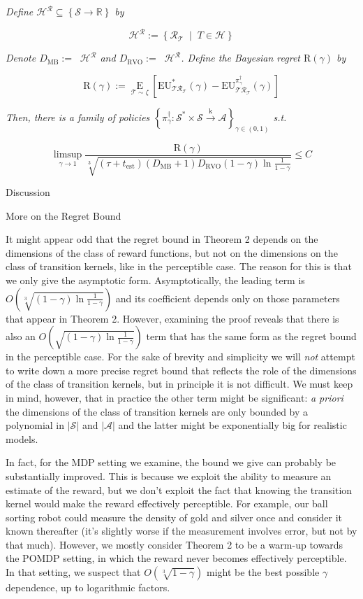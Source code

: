 \documentclass[a4paper]{article}
\newcommand{\Co}[1]{}
\newcommand{\AP}[1]{\left(#1\right)}
\newcommand{\AB}[1]{\left[#1\right]}
\newcommand{\AC}[1]{\left\{#1\right\}}
\newcommand{\ACM}[2]{\left\{#1\;\middle\vert\;#2\right\}}
\newcommand{\Ea}[2]{\underset{#1}{\operatorname{E}}\AB{#2}}
\newcommand{\Reals}{\mathbb{R}}
\newcommand{\Abs}[1]{\left\vert #1 \right\vert}
\newcommand{\K}{\xrightarrow{\mathrm{k}}}
\newcommand{\St}{\mathcal{S}}
\newcommand{\A}{\mathcal{A}}
\newcommand{\R}{\mathcal{R}}
\newcommand{\T}{\mathcal{T}}
\newcommand{\Hy}{\mathcal{H}}
\DeclareMathOperator{\RVO}{\dim_{RVO}}
\DeclareMathOperator{\MB}{\dim_{MB}}
\newcommand{\DRVO}{D_{\mathrm{RVO}}}
\newcommand{\DMB}{D_{\mathrm{MB}}}
\newcommand{\EU}{\mathrm{EU}}
\newcommand{\Reg}{\mathrm{R}}
\begin{document}
\textit{Define $\Hy^\R\subseteq\AC{\St\rightarrow\Reals}$ by}\Co{i}

$$\Hy^\R:=\ACM{\R_\T}{T\in\Hy}$$

\textit{Denote $\DMB:=\MB{\Hy^\R}$ and $\DRVO:=\RVO{\Hy^\R}$. Define the Bayesian regret $\Reg(\gamma)$ by}

$$\Reg(\gamma):=\Ea{\T\sim\zeta}{\EU^*_{\T\R_\T}(\gamma)-\EU^{\pi^\dagger_\gamma}_{\T\R_\T}(\gamma)}$$

\textit{Then, there is a family of policies $\AC{\pi^\dagger_\gamma:\St^*\times\St\K\A}_{\gamma\in(0,1)}$ s.t.}\Co{i}

$$\limsup_{\gamma \rightarrow 1}\frac{\Reg(\gamma)}{\sqrt[3]{\AP{\tau+t_{\mathrm{est}}}\AP{\DMB+1}\DRVO(1-\gamma)\ln{\frac{1}{1-\gamma}}}}\leq C$$

\begin{Huge}Discussion\end{Huge}

\begin{Large}More on the Regret Bound\end{Large}

It might appear odd that the regret bound in Theorem 2 depends on the dimensions of the class of reward functions, but not on the dimensions on the class of transition kernels, like in the perceptible case. The reason for this is that we only give the asymptotic form. Asymptotically, the leading term is $O\AP{\sqrt[3]{\AP{1-\gamma}\ln{\frac{1}{1-\gamma}}}}$ and its coefficient depends only on those parameters that appear in Theorem 2. However, examining the proof reveals that there is also an $O\AP{\sqrt{\AP{1-\gamma}\ln{\frac{1}{1-\gamma}}}}$ term that has the same form as the regret bound in the perceptible case. For the sake of brevity and simplicity we will \textit{not}\Co{i} attempt to write down a more precise regret bound that reflects the role of the dimensions of the class of transition kernels, but in principle it is not difficult. We must keep in mind, however, that in practice the other term might be significant: \textit{a priori}\Co{i} the dimensions of the class of transition kernels are only bounded by a polynomial in $\Abs{\St}$ and $\Abs{\A}$ and the latter might be exponentially big for realistic models. 

In fact, for the MDP setting we examine, the bound we give can probably be substantially improved. This is because we exploit the ability to measure an estimate of the reward, but we don't exploit the fact that knowing the transition kernel would make the reward effectively perceptible. For example, our ball sorting robot could measure the density of gold and silver once and consider it known thereafter (it's slightly worse if the measurement involves error, but not by that much). However, we mostly consider Theorem 2 to be a warm-up towards the POMDP setting, in which the reward never becomes effectively perceptible. In that setting, we suspect that $O\AP{\sqrt[3]{1-\gamma}}$ might be the best possible $\gamma$ dependence, up to logarithmic factors.
\end{document}
